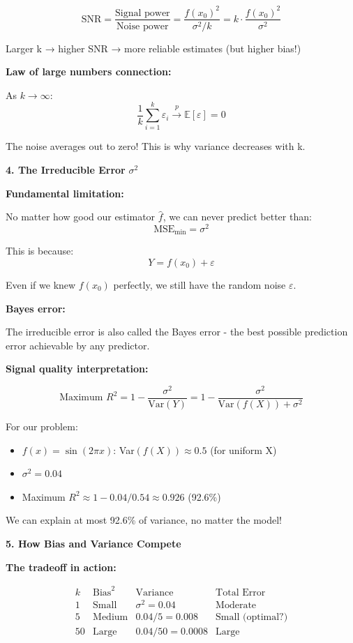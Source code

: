 \documentclass[12pt]{article}
\begin{document}
\begin{explanation}
\[
\text{SNR} = \frac{\text{Signal power}}{\text{Noise power}} = \frac{f(x_0)^2}{\sigma^2/k} = k \cdot \frac{f(x_0)^2}{\sigma^2}
\]

Larger k → higher SNR → more reliable estimates (but higher bias!)

\textbf{Law of large numbers connection:}

As $k \to \infty$:
\[
\frac{1}{k}\sum_{i=1}^k \varepsilon_i \xrightarrow{p} \mathbb{E}[\varepsilon] = 0
\]

The noise averages out to zero! This is why variance decreases with k.

\textbf{4. The Irreducible Error } $\sigma^2$

\textbf{Fundamental limitation:}

No matter how good our estimator $\hat{f}$, we can never predict better than:
\[
\text{MSE}_{\min} = \sigma^2
\]

This is because:
\[
Y = f(x_0) + \varepsilon
\]

Even if we knew $f(x_0)$ perfectly, we still have the random noise $\varepsilon$.

\textbf{Bayes error:}

The irreducible error is also called the Bayes error - the best possible prediction error achievable by any predictor.

\textbf{Signal quality interpretation:}

\[
\text{Maximum } R^2 = 1 - \frac{\sigma^2}{\text{Var}(Y)} = 1 - \frac{\sigma^2}{\text{Var}(f(X)) + \sigma^2}
\]

For our problem:
\begin{itemize}
    \item $f(x) = \sin(2\pi x)$: Var$(f(X)) \approx 0.5$ (for uniform X)
    \item $\sigma^2 = 0.04$
    \item Maximum $R^2 \approx 1 - 0.04/0.54 \approx 0.926$ (92.6\%)
\end{itemize}

We can explain at most 92.6\% of variance, no matter the model!

\textbf{5. How Bias and Variance Compete}

\textbf{The tradeoff in action:}

\[
\begin{array}{c|c|c|c}
k & \text{Bias}^2 & \text{Variance} & \text{Total Error} \\
\hline
1 & \text{Small} & \sigma^2 = 0.04 & \text{Moderate} \\
5 & \text{Medium} & 0.04/5 = 0.008 & \text{Small (optimal?)} \\
50 & \text{Large} & 0.04/50 = 0.0008 & \text{Large} \\
\end{array}
\]


\end{explanation}
\end{document}
